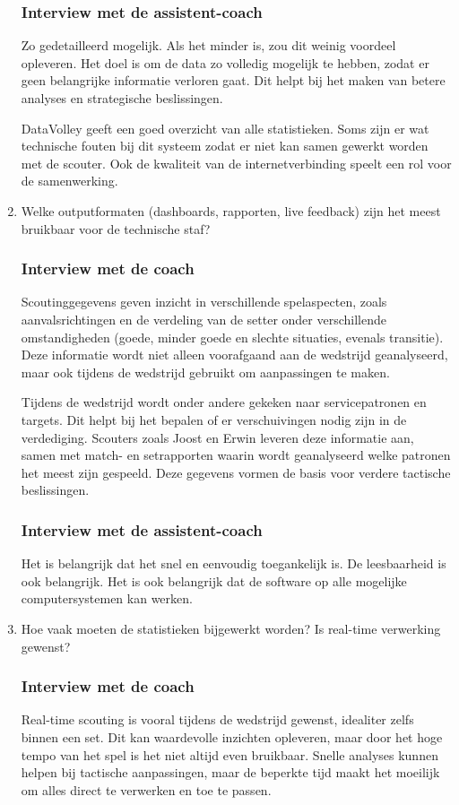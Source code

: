 \begin{enumerate}
  \subsubsection{Interview met de assistent-coach}
  Zo gedetailleerd mogelijk. Als het minder is, zou dit weinig voordeel opleveren. Het doel is om de data zo volledig mogelijk te hebben, zodat er geen belangrijke informatie verloren gaat. Dit helpt bij het maken van betere analyses en strategische beslissingen.

  DataVolley geeft een goed overzicht van alle statistieken. Soms zijn er wat technische fouten bij dit systeem zodat er niet kan samen gewerkt worden met de scouter. Ook de kwaliteit van de internetverbinding speelt een rol voor de samenwerking.
  \item Welke outputformaten (dashboards, rapporten, live feedback) zijn het meest bruikbaar voor de technische staf?
  \subsubsection{Interview met de coach}
  Scoutinggegevens geven inzicht in verschillende spelaspecten, zoals aanvalsrichtingen en de verdeling van de setter onder verschillende omstandigheden (goede, minder goede en slechte situaties, evenals transitie). Deze informatie wordt niet alleen voorafgaand aan de wedstrijd geanalyseerd, maar ook tijdens de wedstrijd gebruikt om aanpassingen te maken.

  Tijdens de wedstrijd wordt onder andere gekeken naar servicepatronen en targets. Dit helpt bij het bepalen of er verschuivingen nodig zijn in de verdediging. Scouters zoals Joost en Erwin leveren deze informatie aan, samen met match- en setrapporten waarin wordt geanalyseerd welke patronen het meest zijn gespeeld. Deze gegevens vormen de basis voor verdere tactische beslissingen.
  \subsubsection{Interview met de assistent-coach}
  Het is belangrijk dat het snel en eenvoudig toegankelijk is. De leesbaarheid is ook belangrijk. Het is ook belangrijk dat de software op alle mogelijke computersystemen kan werken.
  \item Hoe vaak moeten de statistieken bijgewerkt worden? Is real-time verwerking gewenst?
  \subsubsection{Interview met de coach}
  Real-time scouting is vooral tijdens de wedstrijd gewenst, idealiter zelfs binnen een set. Dit kan waardevolle inzichten opleveren, maar door het hoge tempo van het spel is het niet altijd even bruikbaar. Snelle analyses kunnen helpen bij tactische aanpassingen, maar de beperkte tijd maakt het moeilijk om alles direct te verwerken en toe te passen.

\end{enumerate}
